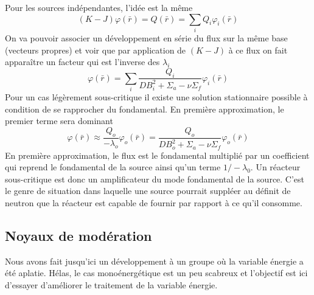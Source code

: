 Pour les sources indépendantes, l'idée est la même
\begin{equation}
(K - J)\varphi (\bar r) = Q(\bar r) = \sum\limits_i    {Q_i}{\varphi _i}(\bar r)
\end{equation}
On va pouvoir associer un développement en série du flux sur la même base (vecteurs propres) et voir
que par application de $(K-J)$ à ce flux on fait apparaître un facteur qui est l'inverse des 
$\lambda_i$
\begin{equation}
\varphi (\bar r) = \sum\limits_i   \frac{{{Q_i}}}{{DB_i^2 + {\Sigma _a} - \nu {\Sigma _f}}}{\varphi _i}(\bar r)
\end{equation}
Pour un cas légèrement sous-critique il existe une solution stationnaire possible à condition de se
rapprocher du fondamental. En première approximation, le premier terme sera dominant 
\begin{equation}
\varphi (\bar r) \approx \frac{{{Q_o}}}{{ - {\lambda _o}}}{\varphi _o}(\bar r) = \frac{{{Q_o}}}{{DB_o^2 + {\Sigma _a} - \nu {\Sigma _f}}}{\varphi _o}(\bar r)
\end{equation}
En première approximation, le flux est le fondamental multiplié par un coefficient qui reprend 
le fondamental de la source ainsi qu'un terme $1/-\lambda_0$. Un réacteur sous-critique est donc 
un amplificateur du mode fondamental de la source. C'est le genre de situation dans laquelle une 
source pourrait suppléer au définit de neutron que la réacteur est capable de fournir par rapport à 
ce qu'il consomme.

\subsection{Noyaux de modération}
Nous avons fait jusqu'ici un développement à un groupe où la variable énergie a été aplatie. Hélas, 
le cas monoénergétique est un peu scabreux et l'objectif est ici d'essayer d'améliorer le traitement 
de la variable énergie. 

